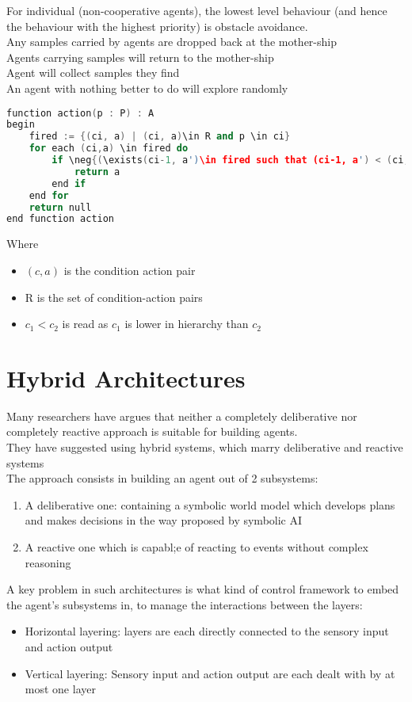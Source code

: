 For individual (non-cooperative agents), the lowest level behaviour (and hence the behaviour with the highest priority) is obstacle avoidance.\\
Any samples carried by agents are dropped back at the mother-ship\\
Agents carrying samples will return to the mother-ship\\
Agent will collect samples they find\\
An agent with nothing better to do will explore randomly

\begin{lstlisting}[language=C++]
function action(p : P) : A
begin
	fired := {(ci, a) | (ci, a)\in R and p \in ci}
	for each (ci,a) \in fired do
		if \neg{(\exists(ci-1, a')\in fired such that (ci-1, a') < (ci,a))} then 
			return a
		end if
	end for
	return null
end function action
\end{lstlisting}
Where 
\begin{itemize}
\item $(c,a)$ is the condition action pair
\item R is the set of condition-action pairs
\item $c_1<c_2$ is read as $c_1$ is lower in hierarchy than  $c_2$
\end{itemize}


\section{Hybrid Architectures}

Many researchers have argues that neither a completely deliberative nor completely reactive approach is suitable for building agents.\\
They have suggested using hybrid systems, which marry deliberative and reactive systems\\
The approach consists in building an agent out of 2 subsystems:
\begin{enumerate}
\item A deliberative one: containing a symbolic world model which develops plans and makes decisions in the way proposed by symbolic AI
\item A reactive one which is capabl;e of reacting to events without complex reasoning
\end{enumerate}
A key problem in such architectures is what kind of control framework to embed the agent's subsystems in, to manage the interactions between the layers:
\begin{itemize}
\item Horizontal layering: layers are each directly connected to the sensory input and action output
\item Vertical layering: Sensory input and action output are each dealt with by at most one layer
\end{itemize}
